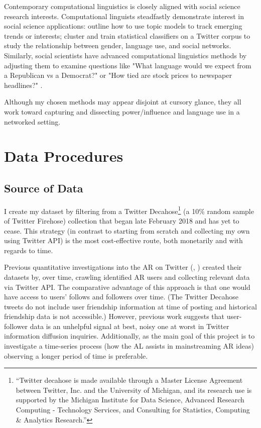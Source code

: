 \documentclass[acmlarge, screen, authorversion]{acmart}
\begin{document}
Contemporary computational linguistics is closely aligned with social science
research interests. Computational linguists steadfastly demonstrate interest in
social science applications: \citep{lauOnlineTrendAnalysis} outline how to use
topic models to track emerging trends or interests;
\cite{bammanGenderIdentityLexical2014} cluster and train statistical classifiers
on a Twitter corpus to study the relationship between gender, language use, and
social networks. Similarly, social scientists have advanced computational
linguistics methods by adjusting them to examine questions like "What language
would we expect from a Republican vs a Democrat?" or "How tied are stock prices
to newspaper headlines?"  \cite{monroeFightinWordsLexical2008,
gentzkowTextData2019}.

Although my chosen methods may appear disjoint at cursory glance, they all work toward capturing and dissecting power/influence and language use in a networked setting.


\section{Data Procedures}

\subsection{Source of Data}

I create my dataset by filtering from a Twitter Decahose\footnote{“Twitter
decahose is made available through a Master License Agreement between Twitter,
Inc. and the University of Michigan, and its research use is supported by the
Michigan Institute for Data Science, Advanced Research Computing - Technology
Services, and Consulting for Statistics, Computing \& Analytics Research.”} (a
10\% random sample of Twitter Firehose) collection that began late February 2018
and has yet to cease. This strategy (in contrast to starting from scratch and
collecting my own using Twitter API) is the most cost-effective route, both
monetarily and with regards to time.

Previous quantitative investigations into the AR on Twitter
(\cite{bergerAltrightTwitterCensus2018},
\cite{alizadehPsychologyMoralityPolitical2019}) created their datasets by, over
time, crawling identified AR users and collecting relevant data via Twitter API.
The comparative advantage of this approach is that one would have access to
users' follows and followers over time. (The Twitter Decahose tweets do not
include user friendship information at time of posting and historical friendship
data is not accessible.) However, previous work
\cite{chaMeasuringUserInfluence2010,
versteegInformationtheoreticMeasuresInfluence2013} suggests that user-follower
data is an unhelpful signal at best, noisy one at worst in Twitter information
diffusion inquiries. Additionally, as the main goal of this project is to
investigate a time-series process (how the AL assists in mainstreaming AR ideas)
observing a longer period of time is preferable.
\end{document}
